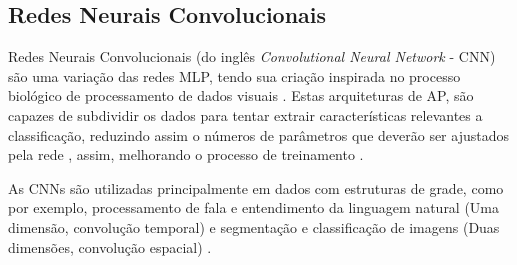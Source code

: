 




\subsection{Redes Neurais Convolucionais}

\par Redes Neurais Convolucionais (do inglês \textit{Convolutional Neural Network} - CNN) são uma variação das redes MLP, tendo sua criação inspirada no processo biológico de processamento de dados visuais \cite{Caroline2016}. Estas arquiteturas de AP, são capazes de subdividir os dados para tentar extrair características relevantes a classificação, reduzindo assim o números de parâmetros que deverão ser ajustados pela rede \cite{Miyazaki2017}, assim, melhorando o processo de treinamento \cite{Miyazaki2017}. %

\par As CNNs são utilizadas principalmente em dados com estruturas de grade, como por exemplo, processamento de fala e entendimento da linguagem natural (Uma dimensão, convolução temporal) \cite{Miyazaki2017} e segmentação e classificação de imagens (Duas dimensões, convolução espacial) \cite{Miyazaki2017, Goodfellow-et-al-2016}.

